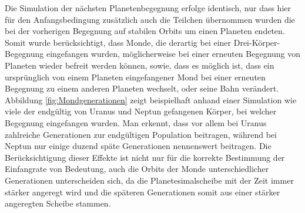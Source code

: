 \documentclass[12pt,a4paper,twoside]{article}
\renewcommand{\cite}{\citep}
\begin{document}
Die Simulation der nächsten Planetenbegegnung erfolge identisch, nur dass hier für den Anfangsbedingung zusätzlich auch die Teilchen übernommen wurden die bei der vorherigen Begegnung auf stabilen Orbits um einen Planeten endeten.
Somit wurde berücksichtigt, dass Monde, die derartig bei einer Drei-Körper-Begegnung eingefangen wurden, möglicherweise bei einer erneuten Begegnung von Planeten wieder befreit werden können, sowie, dass es möglich ist, dass ein ursprünglich von einem Planeten eingefangener Mond bei einer erneuten Begegnung zu einem anderen Planeten wechselt, oder seine Bahn verändert\cite{Nesvorny2007}.
Abbildung \ref{fig:Mondgenerationen} zeigt beispielhaft anhand einer Simulation wie viele der endgültig von Uranus und Neptun gefangenen Körper, bei welcher Begegnung eingefangen wurden.
Man erkennt, dass vor allem bei Uranus zahlreiche Generationen zur endgültigen Population beitragen, während bei Neptun nur einige duzend späte Generationen nennenswert beitragen.
Die Berücksichtigung dieser Effekte ist nicht nur für die korrekte Bestimmung der Einfangrate von Bedeutung, auch die Orbits der Monde unterschiedlicher Generationen unterscheiden sich, da die Planetesimalscheibe mit der Zeit immer stärker angeregt wird und die späteren Generationen somit aus einer stärker angeregten Scheibe stammen\cite{Nesvorny2007}.
\end{document}
